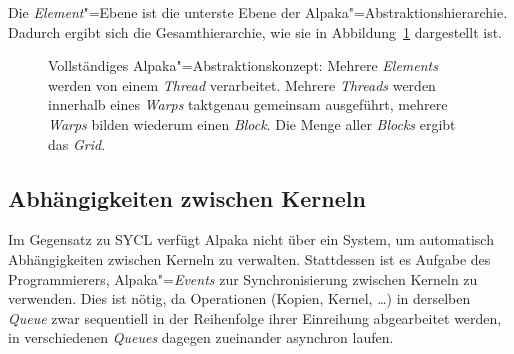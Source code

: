 Die \textit{Element}"=Ebene ist die unterste Ebene der
Alpaka"=Abstraktionshierarchie. Dadurch ergibt sich die Gesamthierarchie, wie
sie in Abbildung~\ref{alpaka:konzepte:abstraktion:elements:vollstaendig}
dargestellt ist.

\begin{figure}
    \centering
    \caption{Vollständiges Alpaka"=Abstraktionskonzept: Mehrere
             \textit{Elements} werden von einem \textit{Thread} verarbeitet.
             Mehrere \textit{Threads} werden innerhalb eines \textit{Warps}
             taktgenau gemeinsam ausgeführt, mehrere \textit{Warps} bilden
             wiederum einen \textit{Block}. Die Menge aller \textit{Blocks}
             ergibt das \textit{Grid}. \cite[nach][22]{worpitz2015}}
    \label{alpaka:konzepte:abstraktion:elements:vollstaendig}
\end{figure}

\subsection{Abhängigkeiten zwischen Kerneln}
\label{alpaka:konzepte:abhaengigkeiten}

Im Gegensatz zu SYCL verfügt Alpaka nicht über ein System, um automatisch
Abhängigkeiten zwischen Kerneln zu verwalten. Stattdessen ist es Aufgabe des
Programmierers, Alpaka"=\textit{Events} zur Synchronisierung zwischen Kerneln zu
verwenden. Dies ist nötig, da Operationen (Kopien, Kernel, \ldots) in derselben
\textit{Queue} zwar sequentiell in der Reihenfolge ihrer Einreihung
abgearbeitet werden, in verschiedenen \textit{Queues} dagegen zueinander
asynchron laufen.

